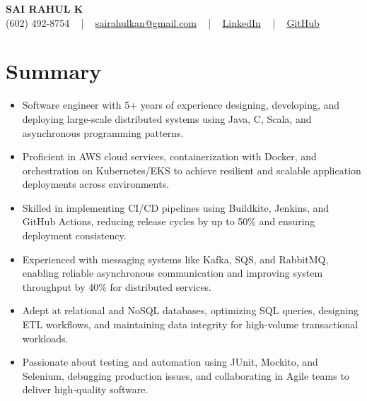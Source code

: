 \documentclass[letterpaper,11pt]{article}
\newcommand{\resumeItem}[1]{
  \item\footnotesize{
    {#1 \vspace{-2pt}}
  }
}
\newcommand{\resumeItemListStart}{\begin{itemize}[leftmargin=*]}
\newcommand{\resumeItemListEnd}{\end{itemize}\vspace{-5pt}}
\begin{document}
\begin{center}
    {\fontsize{14pt}{12pt}\selectfont \textbf{\MakeUppercase{Sai Rahul K}}}\\ \vspace{2pt}
    \fontsize{10pt}{12pt}\selectfont (602) 492-8754 ~ | ~ \href{mailto:sairahulkan@gmail.com}{sairahulkan@gmail.com} ~ | ~
    \href{https://www.linkedin.com/in/rq123/}{\color{blue}\underline{LinkedIn}} ~ | ~
    \href{https://github.com/kanrahuldo}{\color{blue}\underline{GitHub}}~
    \vspace{-8pt}
\end{center}

\section{Summary}
\fontsize{9pt}{10pt}\selectfont
\resumeItemListStart
    \resumeItem{Software engineer with 5+ years of experience designing, developing, and deploying large-scale distributed systems using Java, C\+\+, Scala, and asynchronous programming patterns.}
    \resumeItem{Proficient in AWS cloud services, containerization with Docker, and orchestration on Kubernetes/EKS to achieve resilient and scalable application deployments across environments.}
    \resumeItem{Skilled in implementing CI/CD pipelines using Buildkite, Jenkins, and GitHub Actions, reducing release cycles by up to 50\% and ensuring deployment consistency.}
    \resumeItem{Experienced with messaging systems like Kafka, SQS, and RabbitMQ, enabling reliable asynchronous communication and improving system throughput by 40\% for distributed services.}
    \resumeItem{Adept at relational and NoSQL databases, optimizing SQL queries, designing ETL workflows, and maintaining data integrity for high-volume transactional workloads.}
    \resumeItem{Passionate about testing and automation using JUnit, Mockito, and Selenium, debugging production issues, and collaborating in Agile teams to deliver high-quality software.}
\resumeItemListEnd
\vspace{-6pt}
\end{document}

